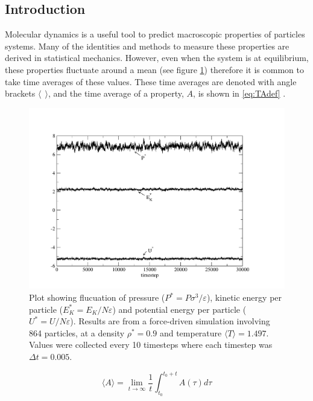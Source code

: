 \documentclass[12pt]{UoAthesis}
\begin{document}
\subsection{Introduction}
Molecular dynamics is a useful tool to predict macroscopic properties
of particles systems.  Many of the identities and methods to measure
these properties are derived in statistical mechanics.  However, even
when the system is at equilibrium, these properties fluctuate around a
mean (see figure \ref{fig:fluctuations}) therefore it is common to
take time averages of these values. These time averages are denoted
with angle brackets $\langle\:\: \rangle$, and the time average of a
property, $A$, is shown in \eqref{eq:TAdef} \cite{Haile1997}.

\begin{figure}[htp] 
  \begin{center}
    \includegraphics[clip,width=\textwidth]{figures/energyplot} 
    \caption{\label{fig:fluctuations} Plot showing flucuation of pressure
      ($P^*=P\sigma^3/\varepsilon$), kinetic energy per particle
      ($E_K^*=E_K/N\varepsilon$) and potential energy per particle
      ($U^*=U/N\varepsilon$).  Results are from a force-driven simulation
      involving 864 particles, at a density $\rho^*=0.9$ and
      temperature $\langle T\rangle=1.497$. Values were collected
      every 10 timesteps where each timestep was $\Delta t = 0.005$.}
  \end{center}
\end{figure}

\begin{equation}
  \label{eq:TAdef}
  \langle A \rangle = \lim_{t \to \infty} \frac{1}{t}  \int^{t_0+t}_{t_0}A(\tau) d\tau
\end{equation}
\end{document}
